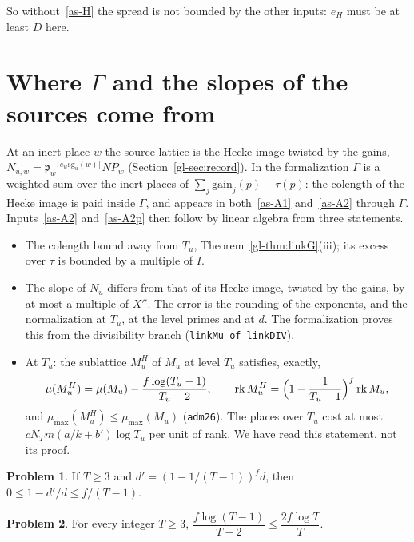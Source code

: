 \documentclass[reqno]{amsart}
\theoremstyle{definition}
\newtheorem{problem}{Problem}[section]
\theoremstyle{plain}
\newcommand{\mumax}{\mu_{\max}}
\newcommand{\tl}[1]{\texttt{#1}}
\begin{document}
So without~\eqref{as-H} the spread is not bounded by the other inputs: \(e_H\) must be at least \(D\) here.

\section{Where \texorpdfstring{\(\Gamma\)}{Gamma} and the slopes of the sources come from}\label{sec:sources}

At an inert place \(w\) the source lattice is the Hecke image twisted by the gains, \(N_{u,w} = \mathfrak p_w^{-\lfloor e_w\mathrm{sg}_u(w)\rfloor}N\!P_w\) (Section~\ref{gl-sec:record}).  In the formalization \(\Gamma\) is a weighted sum over the inert places of \(\sum_j\mathrm{gain}_j(p) - \tau(p)\): the colength of the Hecke image is paid inside \(\Gamma\), and appears in both~\eqref{as-A1} and~\eqref{as-A2} through \(\Gamma\).  Inputs~\eqref{as-A2} and~\eqref{as-A2p} then follow by linear algebra from three statements.
\begin{itemize}
\item The colength bound away from \(T_u\), Theorem~\ref{gl-thm:linkG}(iii); its excess over \(\tau\) is bounded by a multiple of \(I\).
\item The slope of \(N_u\) differs from that of its Hecke image, twisted by the gains, by at most a multiple of \(X''\).  The error is the rounding of the exponents, and the normalization at \(T_u\), at the level primes and at \(d\).  The formalization proves this from the divisibility branch (\tl{linkMu\_of\_linkDIV}).
\item At \(T_u\): the sublattice \(M_u^H\) of \(M_u\) at level \(T_u\) satisfies, exactly,
\[
  \mu(M_u^H) = \mu(M_u) - \frac{f\log(T_u - 1)}{T_u - 2} , \qquad \operatorname{rk} M_u^H = \Bigl(1 - \frac1{T_u - 1}\Bigr)^f\operatorname{rk} M_u ,
\]
and \(\mumax(M_u^H) \le \mumax(M_u)\) (\tl{adm26}).  The places over \(T_u\) cost at most \(cN_Tm(a/k + b')\log T_u\) per unit of rank.  We have read this statement, not its proof.
\end{itemize}

\begin{problem}\label{pr:rank-ratio}
If \(T \ge 3\) and \(d' = (1 - 1/(T - 1))^f d\), then \(0 \le 1 - d'/d \le f/(T - 1)\).
\end{problem}

\begin{problem}\label{pr:level-cost}
For every integer \(T \ge 3\), \(\dfrac{f\log(T - 1)}{T - 2} \le \dfrac{2f\log T}{T}\).
\end{problem}
\end{document}
